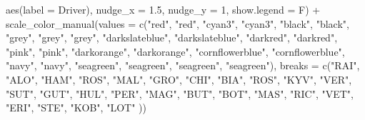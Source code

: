 \documentclass[
]{book}
\newenvironment{Shaded}{\begin{snugshade}}{\end{snugshade}}
\newcommand{\AttributeTok}[1]{\textcolor[rgb]{0.77,0.63,0.00}{#1}}
\newcommand{\DecValTok}[1]{\textcolor[rgb]{0.00,0.00,0.81}{#1}}
\newcommand{\FloatTok}[1]{\textcolor[rgb]{0.00,0.00,0.81}{#1}}
\newcommand{\FunctionTok}[1]{\textcolor[rgb]{0.00,0.00,0.00}{#1}}
\newcommand{\NormalTok}[1]{#1}
\newcommand{\SpecialCharTok}[1]{\textcolor[rgb]{0.00,0.00,0.00}{#1}}
\newcommand{\StringTok}[1]{\textcolor[rgb]{0.31,0.60,0.02}{#1}}
\begin{document}
\begin{Shaded}
\begin{Highlighting}[]
            \FunctionTok{aes}\NormalTok{(}\AttributeTok{label =}\NormalTok{ Driver),}
            \AttributeTok{nudge\_x =} \FloatTok{1.5}\NormalTok{, }\AttributeTok{nudge\_y =} \DecValTok{1}\NormalTok{, }\AttributeTok{show.legend =}\NormalTok{ F) }\SpecialCharTok{+} 
  \FunctionTok{scale\_color\_manual}\NormalTok{(}\AttributeTok{values =} \FunctionTok{c}\NormalTok{(}\StringTok{"red"}\NormalTok{, }\StringTok{"red"}\NormalTok{, }
                                \StringTok{"cyan3"}\NormalTok{, }\StringTok{"cyan3"}\NormalTok{, }
                                \StringTok{"black"}\NormalTok{, }\StringTok{"black"}\NormalTok{, }
                                \StringTok{"grey"}\NormalTok{, }\StringTok{"grey"}\NormalTok{, }\StringTok{"grey"}\NormalTok{,}
                                \StringTok{"darkslateblue"}\NormalTok{, }\StringTok{"darkslateblue"}\NormalTok{,}
                                \StringTok{"darkred"}\NormalTok{, }\StringTok{"darkred"}\NormalTok{, }
                                \StringTok{"pink"}\NormalTok{, }\StringTok{"pink"}\NormalTok{, }
                                \StringTok{"darkorange"}\NormalTok{, }\StringTok{"darkorange"}\NormalTok{, }
                                \StringTok{"cornflowerblue"}\NormalTok{, }\StringTok{"cornflowerblue"}\NormalTok{, }
                                \StringTok{"navy"}\NormalTok{, }\StringTok{"navy"}\NormalTok{,}
                                \StringTok{"seagreen"}\NormalTok{, }\StringTok{"seagreen"}\NormalTok{, }\StringTok{"seagreen"}\NormalTok{,  }\StringTok{"seagreen"}\NormalTok{),}
                     \AttributeTok{breaks =} \FunctionTok{c}\NormalTok{(}\StringTok{"RAI"}\NormalTok{, }\StringTok{"ALO"}\NormalTok{,}
                                \StringTok{"HAM"}\NormalTok{, }\StringTok{"ROS"}\NormalTok{,}
                                \StringTok{"MAL"}\NormalTok{, }\StringTok{"GRO"}\NormalTok{,}
                                \StringTok{"CHI"}\NormalTok{, }\StringTok{"BIA"}\NormalTok{, }\StringTok{"ROS"}\NormalTok{,}
                                \StringTok{"KYV"}\NormalTok{, }\StringTok{"VER"}\NormalTok{,}
                                \StringTok{"SUT"}\NormalTok{, }\StringTok{"GUT"}\NormalTok{, }
                                \StringTok{"HUL"}\NormalTok{, }\StringTok{"PER"}\NormalTok{,  }
                                \StringTok{"MAG"}\NormalTok{,  }\StringTok{"BUT"}\NormalTok{,}
                                \StringTok{"BOT"}\NormalTok{, }\StringTok{"MAS"}\NormalTok{,}
                                \StringTok{"RIC"}\NormalTok{, }\StringTok{"VET"}\NormalTok{,}
                                \StringTok{"ERI"}\NormalTok{, }\StringTok{"STE"}\NormalTok{, }\StringTok{"KOB"}\NormalTok{, }\StringTok{"LOT"}
\NormalTok{                                )) }
\end{Highlighting}
\end{Shaded}
\end{document}
